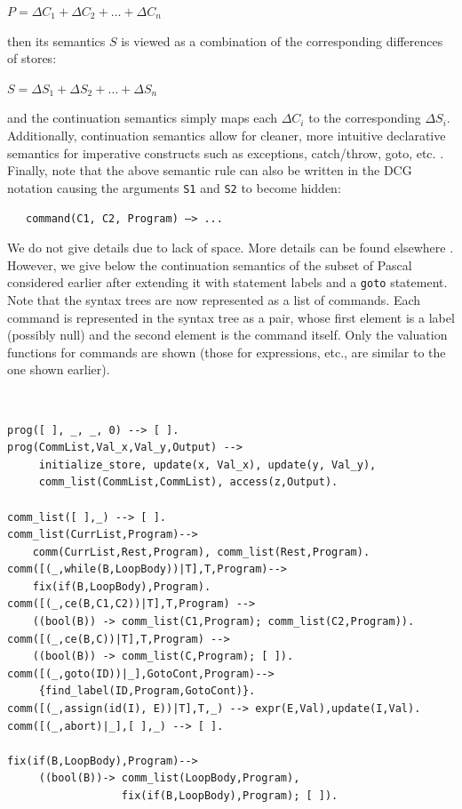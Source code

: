 \documentclass{entcs}
\begin{document}
$P = \Delta C_1 + \Delta C_2 + \dots + \Delta C_n$

\noindent then its semantics $S$ is viewed as a combination of the corresponding
differences of stores:

$S = \Delta S_1 + \Delta S_2 + \dots + \Delta S_n$

\noindent and the continuation semantics simply maps each
$\Delta C_i$ to the corresponding $\Delta S_i$.
Additionally, continuation 
semantics allow for cleaner, more intuitive declarative semantics for
imperative constructs such as exceptions, catch/throw, goto, etc. 
\cite{schmidt}. 
Finally, note that the above semantic rule can also be written in the DCG notation
causing the arguments {\tt S1} and {\tt S2} to become hidden:

~~~{\tt command(C1, C2, Program) --> ...}

\noindent
We do not give details due to lack of space. More details can be found elsewhere 
\cite{diffsem}.  However, we give below the continuation semantics 
of the subset of Pascal considered earlier after extending it with statement 
labels and a {\tt goto} statement.  
Note that the syntax trees are now represented as a list of commands. Each
command is represented in the syntax tree as a pair, whose first element
is a label (possibly null) and the second element is the command itself.
Only the valuation functions for commands are shown (those for expressions,
etc., are similar to the one shown earlier).

{\small\tt
\begin{verbatim}
prog([ ], _, _, 0) --> [ ].
prog(CommList,Val_x,Val_y,Output) -->
     initialize_store, update(x, Val_x), update(y, Val_y),
     comm_list(CommList,CommList), access(z,Output).

comm_list([ ],_) --> [ ].
comm_list(CurrList,Program)-->
    comm(CurrList,Rest,Program), comm_list(Rest,Program).
comm([(_,while(B,LoopBody))|T],T,Program)--> 
    fix(if(B,LoopBody),Program).
comm([(_,ce(B,C1,C2))|T],T,Program) -->
    ((bool(B)) -> comm_list(C1,Program); comm_list(C2,Program)).
comm([(_,ce(B,C))|T],T,Program) -->  
    ((bool(B)) -> comm_list(C,Program); [ ]).
comm([(_,goto(ID))|_],GotoCont,Program)-->
     {find_label(ID,Program,GotoCont)}.
comm([(_,assign(id(I), E))|T],T,_) --> expr(E,Val),update(I,Val). 
comm([(_,abort)|_],[ ],_) --> [ ].

fix(if(B,LoopBody),Program)-->
     ((bool(B))-> comm_list(LoopBody,Program),
                  fix(if(B,LoopBody),Program); [ ]).
\end{verbatim}
}
\end{document}
